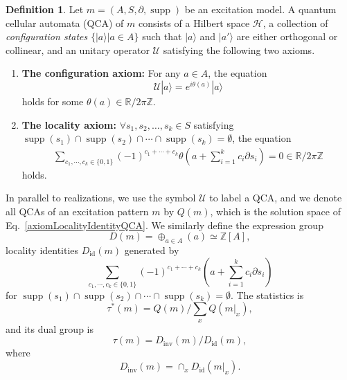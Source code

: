 \documentclass[reprint, amsmath, amssymb, showpacs, floatfix, longbibliography, aps, twocolumn, superscriptaddress, nofootinbib]{revtex4-2}
\newcommand{\ZZ}{{\mathbb Z}}
\newcommand{\RR}{{\mathbb R}}
\newcommand{\supp}{\operatorname{supp}}
\newcommand{\id}{{\operatorname{id}}}
\newcommand{\inv}{{\operatorname{inv}}}
\theoremstyle{definition}
\newtheorem{definition}{Definition}[section]
\begin{document}
\begin{definition}\label{defQCA}
	Let $m=(A,S,\partial,\supp)$ be an excitation model. A quantum cellular automata (QCA) of $m$ consists of a Hilbert space $\mathcal{H}$, a collection of \textit{configuration states} $\{|a\rangle|a\in A\}$ such that $|a\rangle$ and $|a'\rangle$ are either orthogonal or collinear, and an unitary operator $\mathcal{U}$ satisfying the following two axioms.
	\begin{enumerate}
		\item \textbf{The configuration axiom:} For any $a\in A$, the equation
		\begin{equation}\label{axiomConfigurationQCA}
			\mathcal{U}|a\rangle=e^{i\theta(a)}|a\rangle
		\end{equation}
		holds for some $\theta(a)\in \RR/2\pi\ZZ$.
		\item \textbf{The locality axiom:} \(\forall s_1, s_2, \dots, s_k \in S\) satisfying \(\operatorname{supp}(s_1) \cap \operatorname{supp}(s_2) \cap \cdots \cap \operatorname{supp}(s_k) = \emptyset\), the equation
		\begin{align}\label{axiomLocalityIdentityQCA}
			\sum_{c_1,\cdots,c_k\in\{0,1\}}(-1)^{c_1+\cdots+c_k}\theta(a+\sum_{i=1}^kc_i\partial s_i)=0\in \RR/2\pi\ZZ
		\end{align}
		holds.
	\end{enumerate}
	
\end{definition}

In parallel to realizations, we use the symbol $\mathcal{U}$ to label a QCA, and we denote all QCAs of an excitation pattern $m$ by $Q(m)$, which is the solution space of Eq.~\eqref{axiomLocalityIdentityQCA}. We similarly define the expression group 
\begin{equation}
	D(m)=\oplus_{a\in A}\left(a\right)\simeq \ZZ[A],
\end{equation} 
locality identities $D_\id(m)$ generated by
\begin{equation}\label{eqGeneratorOfDid}
	\sum_{c_1,\cdots,c_k\in\{0,1\}}(-1)^{c_1+\cdots+c_k}\left(a+\sum_{i=1}^kc_i\partial s_i\right)
\end{equation}
for \(\operatorname{supp}(s_1) \cap \operatorname{supp}(s_2) \cap \cdots \cap \operatorname{supp}(s_k) = \emptyset\). The statistics is 
\begin{equation}
	\tau^*(m)=Q(m)/\sum_{x}Q(m|_x),
\end{equation}
and its dual group is
\begin{equation}
	\tau(m)=D_\inv(m)/D_\id(m),
\end{equation}
where 
\begin{equation}
	D_\inv(m)=\cap_xD_\id(m|_x).
\end{equation}
\end{document}

